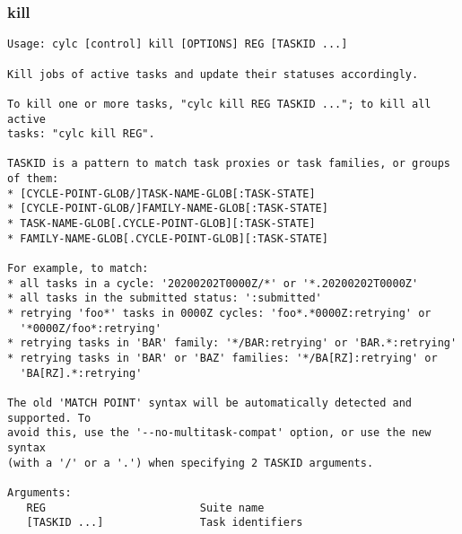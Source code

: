 \subsubsection{kill}
\label{kill}
\begin{lstlisting}
Usage: cylc [control] kill [OPTIONS] REG [TASKID ...] 

Kill jobs of active tasks and update their statuses accordingly.

To kill one or more tasks, "cylc kill REG TASKID ..."; to kill all active
tasks: "cylc kill REG".

TASKID is a pattern to match task proxies or task families, or groups of them:
* [CYCLE-POINT-GLOB/]TASK-NAME-GLOB[:TASK-STATE]
* [CYCLE-POINT-GLOB/]FAMILY-NAME-GLOB[:TASK-STATE]
* TASK-NAME-GLOB[.CYCLE-POINT-GLOB][:TASK-STATE]
* FAMILY-NAME-GLOB[.CYCLE-POINT-GLOB][:TASK-STATE]

For example, to match:
* all tasks in a cycle: '20200202T0000Z/*' or '*.20200202T0000Z'
* all tasks in the submitted status: ':submitted'
* retrying 'foo*' tasks in 0000Z cycles: 'foo*.*0000Z:retrying' or
  '*0000Z/foo*:retrying'
* retrying tasks in 'BAR' family: '*/BAR:retrying' or 'BAR.*:retrying'
* retrying tasks in 'BAR' or 'BAZ' families: '*/BA[RZ]:retrying' or
  'BA[RZ].*:retrying'

The old 'MATCH POINT' syntax will be automatically detected and supported. To
avoid this, use the '--no-multitask-compat' option, or use the new syntax
(with a '/' or a '.') when specifying 2 TASKID arguments.

Arguments:
   REG                        Suite name
   [TASKID ...]               Task identifiers


\end{lstlisting}
